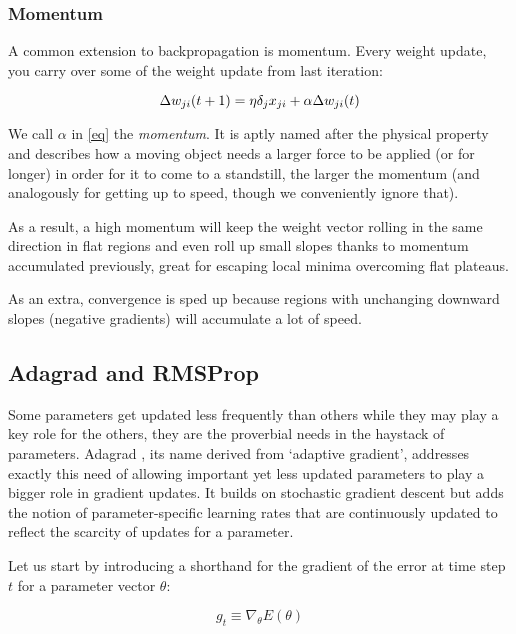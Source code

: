 \subsubsection{Momentum}
A common extension to backpropagation is momentum.
Every weight update,
you carry over some of the weight update from last iteration:

\begin{equation}
  \Delta w_{ji}(t+1) = \eta \delta_j x_{ji} + \\
  \alpha \Delta w_{ji}(t)
  \label{eq:momentum}
\end{equation}

We call $\alpha$ in \ref{eq} the \textit{momentum}.
It is aptly named after the physical property
and describes how a moving object needs a
larger force to be applied (or for longer)
in order for it to come to a standstill,
the larger the momentum
(and analogously for getting up to speed,
though we conveniently ignore that).

As a result,
a high momentum will keep the weight vector
rolling in the same direction in flat regions
and even roll up small slopes thanks to momentum
accumulated previously,
great for escaping local minima
overcoming flat plateaus.

As an extra,
convergence is sped up
because regions with unchanging downward slopes (negative gradients)
will accumulate a lot of speed.

\subsection{Adagrad and RMSProp}
\label{sub:adagrad_and_rmsprop}
Some parameters get updated less frequently than others
while they may play a key role for the others,
they are the proverbial needs in the haystack of parameters.
Adagrad \parencite{Duchi2011},
its name derived from `adaptive gradient',
addresses exactly this need of allowing important
yet less updated parameters
to play a bigger role in gradient updates.
It builds on stochastic gradient descent
but adds the notion
of parameter-specific learning rates
that are continuously updated to reflect
the scarcity of updates for a parameter.

Let us start by introducing a shorthand for
the gradient of the error at time step $t$
for a parameter vector $\theta$:

\begin{equation}
  g_{t} \equiv \nabla_\theta E(\theta)
\end{equation}

